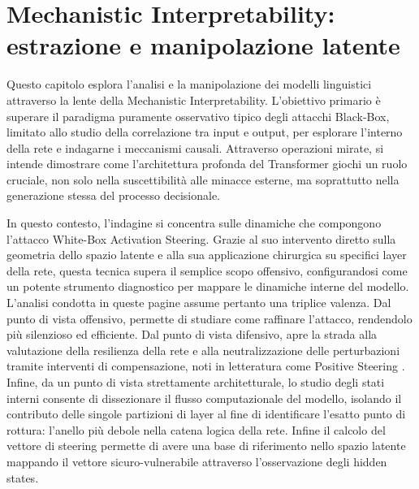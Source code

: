 \chapter{Mechanistic Interpretability: estrazione e manipolazione latente}

Questo capitolo esplora l'analisi e la manipolazione dei modelli linguistici attraverso la lente della Mechanistic Interpretability. L'obiettivo primario è superare il paradigma puramente osservativo tipico degli attacchi Black-Box, limitato allo studio della correlazione tra input e output, per esplorare l'interno della rete e indagarne i meccanismi causali. Attraverso operazioni mirate, si intende dimostrare come l'architettura profonda del Transformer giochi un ruolo cruciale, non solo nella suscettibilità alle minacce esterne, ma soprattutto nella generazione stessa del processo decisionale.

In questo contesto, l'indagine si concentra sulle dinamiche che compongono l'attacco White-Box Activation Steering. Grazie al suo intervento diretto sulla geometria dello spazio latente e alla sua applicazione chirurgica su specifici layer della rete, questa tecnica supera il semplice scopo offensivo, configurandosi come un potente strumento diagnostico per mappare le dinamiche interne del modello.\\

L'analisi condotta in queste pagine assume pertanto una triplice valenza. Dal punto di vista offensivo, permette di studiare come raffinare l'attacco, rendendolo più silenzioso ed efficiente. Dal punto di vista difensivo, apre la strada alla valutazione della resilienza della rete e alla neutralizzazione delle perturbazioni tramite interventi di compensazione, noti in letteratura come Positive Steering \cite{Wendlinger2026}. Infine, da un punto di vista strettamente architetturale, lo studio degli stati interni consente di dissezionare il flusso computazionale del modello, isolando il contributo delle singole partizioni di layer al fine di identificare l'esatto punto di rottura: l'anello più debole nella catena logica della rete.
Infine il calcolo del vettore di steering permette di avere una base di riferimento nello spazio latente mappando il vettore sicuro-vulnerabile attraverso l'osservazione degli hidden states.





